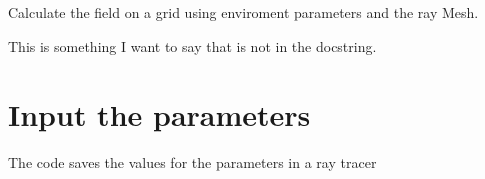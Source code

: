 \documentclass[letterpaper,10pt,english]{sphinxmanual}
\begin{document}

\begin{fulllineitems}
\label{index:RayTracerMainProgram.power_grid}
Calculate the field on a grid using enviroment parameters and the   ray Mesh.

\end{fulllineitems}


This is something I want to say that is not in the docstring.


\chapter{Input the parameters}
\label{index:module-ParameterInput}\label{index:input-the-parameters}
The code saves the values for the parameters in a ray tracer
\end{document}
